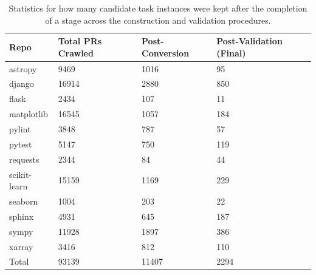 \begin{table}[ht]
\centering
\begin{tabular}{l|lll}
\toprule
    Repo & Total PRs Crawled & Post-Conversion & Post-Validation (Final) \\
\midrule
    astropy & \num{9469} & \num{1016} & \num{95} \\
    django & \num{16914} & \num{2880} & \num{850} \\
    flask & \num{2434} & \num{107} & \num{11} \\
    matplotlib & \num{16545} & \num{1057} & \num{184} \\
    pylint & \num{3848} & \num{787} & \num{57} \\
    pytest & \num{5147} & \num{750} & \num{119} \\
    requests & \num{2344} & \num{84} & \num{44} \\
    scikit-learn & \num{15159} & \num{1169} & \num{229} \\
    seaborn & \num{1004} & \num{203} & \num{22} \\
    sphinx & \num{4931} & \num{645} & \num{187} \\
    sympy & \num{11928} & \num{1897} & \num{386} \\
    xarray & \num{3416} & \num{812} & \num{110} \\
\midrule
    Total & \num{93139} & \num{11407} & \num{2294} \\
\bottomrule
\end{tabular}
\caption{Statistics for how many candidate task instances were kept after the completion of a stage across the construction and validation procedures.}
\label{table:repo-conversion-stats}
\end{table}